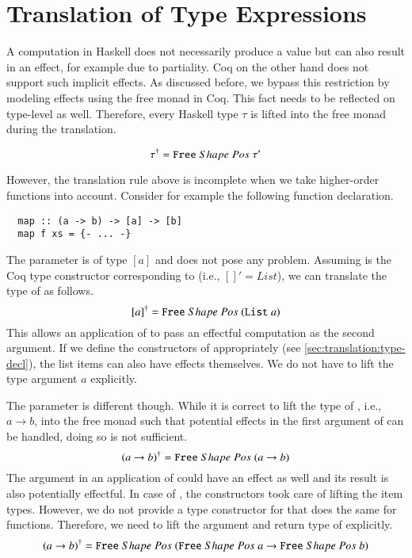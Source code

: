 \section{Translation of Type Expressions} \label{sec:translation:type}
A computation in Haskell does not necessarily produce a value but can also result in an effect, for example due to partiality.
Coq on the other hand does not support such implicit effects.
As discussed before, we bypass this restriction by modeling effects using the free monad in Coq.
This fact needs to be reflected on type-level as well.
Therefore, every Haskell type $\tau$ is lifted into the free monad during the translation.

\[
  {\tau}^{\dagger} = {\texttt{Free}}\;Shape\;Pos\;{\tau'}
\]

However, the translation rule above is incomplete when we take higher-order functions into account.
Consider for example the following function declaration.
\begin{verbatim}
  map :: (a -> b) -> [a] -> [b]
  map f xs = {- ... -}
\end{verbatim}

The parameter  is of type $[a]$ and does not pose any problem.
Assuming  is the Coq type constructor corresponding to \haskell{[]} (i.e., $[]' = List$), we can translate the type of  as follows.
\[
  {[a]}^{\dagger} = {\texttt{Free}}\;Shape\;Pos\;{(\texttt{List}\;a)}
\]
This allows an application of  to pass an effectful computation as the second argument.
If we define the constructors of  appropriately (see \autoref{sec:translation:type-decl}), the list items can also have effects themselves.
We do not have to lift the type argument $a$ explicitly.

The parameter  is different though.
While it is correct to lift the type of , i.e., $a \rightarrow b$, into the free monad such that potential effects in the first argument of  can be handled, doing so is not sufficient.
\[
  {(a \rightarrow b)}^{\dagger} = {\texttt{Free}}\;Shape\;Pos\;{(a \rightarrow b)}
\]
The argument in an application of  could have an effect as well and its result is also potentially effectful.
In case of , the  constructors took care of lifting the item types.
However, we do not provide a type constructor for \coq{->} that does the same for functions.
Therefore, we need to lift the argument and return type of  explicitly.
\[
  {(a \rightarrow b)}^{\dagger} = {\texttt{Free}}\;Shape\;Pos\;{({\texttt{Free}}\;Shape\;Pos\;{a} \rightarrow {\texttt{Free}}\;Shape\;Pos\;{b})}
\]


